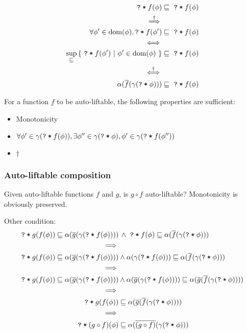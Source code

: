 \documentclass[11pt,a4paper]{article}
\newcommand{\ttt}{\texttt}
\newcommand{\dom}{\ensuremath{\textrm{dom}}}
\newcommand{\qm}{\ttt{?}}
\newcommand{\withqm}[1]{\ttt{\qm\:*\:$#1$}}
\begin{document}
\begin{align*}
\withqm{f(\phi)} &\sqsubseteq \,\,\withqm{f(\phi)} \\
\overset{\dagger}{\implies} \\
\forall \phi' \in \dom(\phi), \withqm{f(\phi')} &\sqsubseteq \,\,\withqm{f(\phi)} \\
\iff \\
\sup_{\sqsubseteq} {\{~ \withqm{f(\phi')} ~|~ \phi' \in \dom(\phi) ~\}} &\sqsubseteq \,\,\withqm{f(\phi)} \\
\overset{\dagger}{\iff} \\
\alpha(\overline{f}(\gamma(\withqm{\phi}))) &\sqsubseteq \,\,\withqm{f(\phi)}
\end{align*}

For a function $f$ to be auto-liftable, the following properties are sufficient:
\begin{itemize}
    \item Monotonicity
    \item $\forall \phi' \in \gamma(\withqm{f(\phi)}), \exists \phi'' \in \gamma(\withqm{\phi}), \phi' \in \gamma(\withqm{f(\phi'')})$ 
    \item $\dagger$
\end{itemize}

\subsubsection{Auto-liftable composition}
Given auto-liftable functions $f$ and $g$, is $g \circ f$ auto-liftable?
Monotonicity is obviously preserved.

Other condition:
\begin{align*}
\withqm{g(f(\phi))} \sqsubseteq \alpha(\overline{g}(\gamma(\withqm{f(\phi)}))) &\,\wedge
\,\,\withqm{f(\phi)} \sqsubseteq \alpha(\overline{f}(\gamma(\withqm{\phi}))) \\
\implies \\
\withqm{g(f(\phi))} \sqsubseteq \alpha(\overline{g}(\gamma(\withqm{f(\phi)}))) &\wedge
\alpha(\gamma(\withqm{f(\phi)})) \sqsubseteq \alpha(\overline{f}(\gamma(\withqm{\phi}))) \\
\implies \\
\withqm{g(f(\phi))} \sqsubseteq \alpha(\overline{g}(\gamma(\withqm{f(\phi)}))) &\wedge
\alpha(\overline{g}(\gamma(\withqm{f(\phi)}))) \sqsubseteq \alpha(\overline{g}(\overline{f}(\gamma(\withqm{\phi})))) \\
\implies \\
\withqm{g(f(\phi))} &\sqsubseteq \alpha(\overline{g}(\overline{f}(\gamma(\withqm{\phi})))) \\
\implies \\
\withqm{(g \circ f)(\phi)} &\sqsubseteq \alpha(\overline{(g \circ f)}(\gamma(\withqm{\phi}))) \\
\end{align*}
\end{document}
